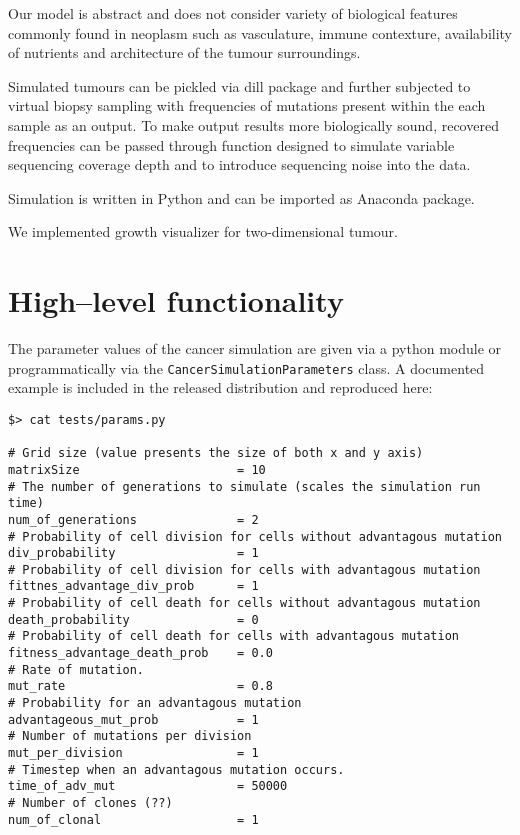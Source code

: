 \documentclass[11pt,a4paper]{article}
\begin{document}
Our model is abstract and does not consider variety of biological features commonly found in neoplasm such as vasculature, immune contexture, availability of nutrients and architecture of the tumour surroundings.


Simulated tumours can be pickled via dill package \cite{mckerns:arXiv:2012} and further subjected to virtual biopsy sampling with frequencies of mutations present within the each sample as an output.
To make output results more biologically sound, recovered frequencies can be passed through function designed to simulate variable sequencing coverage depth and to introduce sequencing noise into the data.




Simulation is written in Python and can be imported as Anaconda package.

We implemented growth visualizer for two-dimensional tumour.

\section{High--level functionality}
The parameter values of the cancer simulation are given via a python module or
programmatically via the \texttt{CancerSimulationParameters} class. A documented
example is included in the released distribution and reproduced here:

\begin{verbatim}
$> cat tests/params.py

# Grid size (value presents the size of both x and y axis)
matrixSize                      = 10
# The number of generations to simulate (scales the simulation run time)
num_of_generations              = 2
# Probability of cell division for cells without advantagous mutation
div_probability                 = 1
# Probability of cell division for cells with advantagous mutation
fittnes_advantage_div_prob      = 1
# Probability of cell death for cells without advantagous mutation
death_probability               = 0
# Probability of cell death for cells with advantagous mutation
fitness_advantage_death_prob    = 0.0
# Rate of mutation.
mut_rate                        = 0.8
# Probability for an advantagous mutation
advantageous_mut_prob           = 1
# Number of mutations per division
mut_per_division                = 1
# Timestep when an advantagous mutation occurs.
time_of_adv_mut                 = 50000
# Number of clones (??)
num_of_clonal                   = 1
\end{verbatim}
\end{document}
